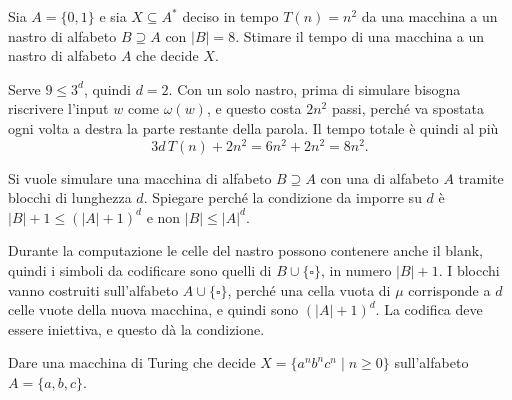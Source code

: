 \newpage

\begin{ex}
Sia $A=\{0,1\}$ e sia $X\subseteq A^*$ deciso in tempo $T(n)=n^2$ da una macchina a un nastro di alfabeto $B\supseteq A$ con $|B|=8$. Stimare il tempo di una macchina a un nastro di alfabeto $A$ che decide $X$.
\end{ex}

\begin{sol}
Serve $9\leq 3^d$, quindi $d=2$. Con un solo nastro, prima di simulare bisogna riscrivere l'input $w$ come $\omega(w)$, e questo costa $2n^2$ passi, perché va spostata ogni volta a destra la parte restante della parola. Il tempo totale è quindi al più
\[
3d\,T(n)+2n^2=6n^2+2n^2=8n^2 .
\]
\end{sol}

\newpage

\begin{ex}
Si vuole simulare una macchina di alfabeto $B\supseteq A$ con una di alfabeto $A$ tramite blocchi di lunghezza $d$. Spiegare perché la condizione da imporre su $d$ è $|B|+1\leq(|A|+1)^d$ e non $|B|\leq|A|^d$.
\end{ex}

\begin{sol}
Durante la computazione le celle del nastro possono contenere anche il blank, quindi i simboli da codificare sono quelli di $B\cup\{\square\}$, in numero $|B|+1$. I blocchi vanno costruiti sull'alfabeto $A\cup\{\square\}$, perché una cella vuota di $\mu$ corrisponde a $d$ celle vuote della nuova macchina, e quindi sono $(|A|+1)^d$. La codifica deve essere iniettiva, e questo dà la condizione.
\end{sol}

\newpage 


\begin{ex}
Dare una macchina di Turing che decide $X=\{a^nb^nc^n\mid n\geq 0\}$ sull'alfabeto $A=\{a,b,c\}$.
\end{ex}

